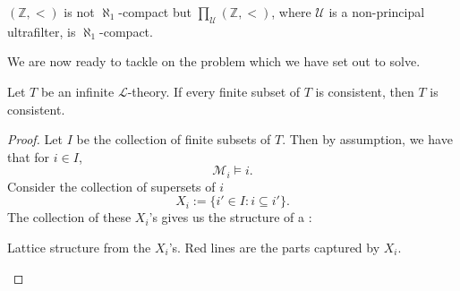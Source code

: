 \documentclass[notoc,notitlepage]{tufte-book}
\begin{document}
\begin{eg}
  $(\mathbb{Z}, <)$ is not $\aleph_1$-compact but $\prod_{\mathcal{U}} (\mathbb{Z}, <)$, where $\mathcal{U}$ is a non-principal ultrafilter, is $\aleph_1$-compact.
\end{eg}

We are now ready to tackle on the problem which we have set out to solve.

\begin{thm}\label{thm:compactness_theorem}
  Let $T$ be an infinite $\mathcal{L}$-theory. If every finite subset of $T$ is consistent, then $T$ is consistent.
\end{thm}

\begin{proof}
  Let $I$ be the collection of finite subsets of $T$. Then by assumption, we have that for $i \in I$,
  \begin{equation*}
    \mathcal{M}_i \models i.
  \end{equation*}
  Consider the collection of supersets of $i$
  \begin{equation*}
    X_i := \{ i' \in I : i \subseteq i' \}.
  \end{equation*}
  The collection of these $X_i$'s gives us the structure of a :
  \begin{marginfigure}
    \caption{Lattice structure from the $X_i$'s. Red lines are the parts captured by $X_i$.}\label{fig:lattice_structure_from_the_x_i_s}
  \end{marginfigure}
\end{proof}
\end{document}
